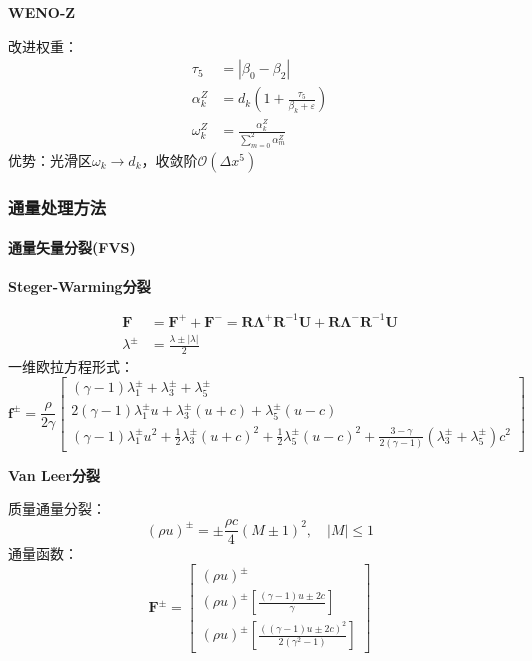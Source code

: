\documentclass[UTF8]{ctexart}
\begin{document}
\textbf{WENO-Z}

改进权重：
\begin{align}
\tau_5 &= |\beta_0 - \beta_2| \\
\alpha_k^Z &= d_k \left( 1 + \frac{\tau_5}{\beta_k + \varepsilon} \right) \\
\omega_k^Z &= \frac{\alpha_k^Z}{\sum_{m=0}^{2} \alpha_m^Z}
\end{align}
优势：光滑区$\omega_k \to d_k$，收敛阶$\mathcal{O}(\Delta x^5)$

\subsubsection{通量处理方法}

\paragraph{通量矢量分裂(FVS)}

\textbf{Steger-Warming分裂}

\begin{align}
\mathbf{F} &= \mathbf{F}^+ + \mathbf{F}^- = \mathbf{R}\mathbf{\Lambda}^+\mathbf{R}^{-1}\mathbf{U} + \mathbf{R}\mathbf{\Lambda}^-\mathbf{R}^{-1}\mathbf{U} \\
\lambda^\pm &= \frac{\lambda \pm |\lambda|}{2}
\end{align}
一维欧拉方程形式：
\begin{equation}
\mathbf{f}^{\pm} = \frac{\rho}{2\gamma} \begin{bmatrix}
(\gamma-1)\lambda_1^\pm + \lambda_3^\pm + \lambda_5^\pm \\
2(\gamma-1)\lambda_1^\pm u + \lambda_3^\pm (u+c) + \lambda_5^\pm (u-c) \\
(\gamma-1)\lambda_1^\pm u^2 + \frac{1}{2}\lambda_3^\pm (u+c)^2 + \frac{1}{2}\lambda_5^\pm (u-c)^2 + \frac{3-\gamma}{2(\gamma-1)}(\lambda_3^\pm + \lambda_5^\pm)c^2
\end{bmatrix}
\end{equation}

\textbf{Van Leer分裂}

质量通量分裂：
\begin{equation}
(\rho u)^\pm = \pm \frac{\rho c}{4} (M \pm 1)^2, \quad |M| \leq 1
\end{equation}
通量函数：
\begin{equation}
\mathbf{F}^\pm = \begin{bmatrix}
(\rho u)^\pm \\
(\rho u)^\pm \left[ \frac{(\gamma-1)u \pm 2c}{\gamma} \right] \\
(\rho u)^\pm \left[ \frac{ \left( (\gamma-1)u \pm 2c \right)^2 }{2(\gamma^2-1)} \right]
\end{bmatrix}
\end{equation}
\end{document}
